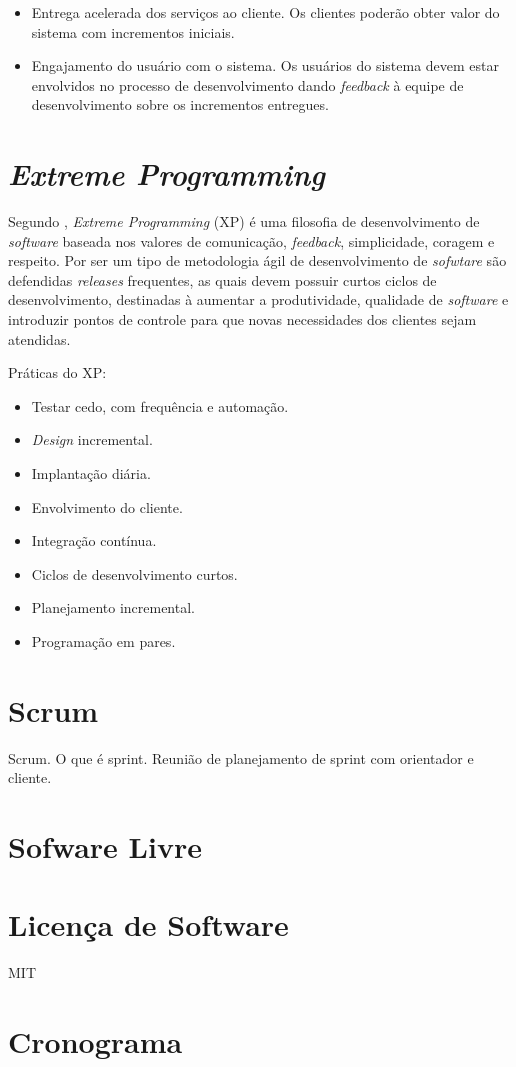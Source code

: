 \begin{itemize}
    \item Entrega acelerada dos serviços ao cliente. Os clientes poderão obter valor do sistema com incrementos iniciais.
    \item Engajamento do usuário com o sistema. Os usuários do sistema devem estar envolvidos no processo
    de desenvolvimento dando \textit{feedback} à equipe de desenvolvimento sobre os incrementos entregues.
\end{itemize}

\section{\textit{Extreme Programming}}
Segundo \cite{beck_2004}, \textit{Extreme Programming} (XP) é uma filosofia de desenvolvimento de
\textit{software} baseada nos valores de comunicação, \textit{feedback}, simplicidade, coragem e respeito.
Por ser um tipo de metodologia ágil de desenvolvimento de \textit{sofwtare} são defendidas \textit{releases}
frequentes, as quais devem possuir curtos ciclos de desenvolvimento, destinadas à aumentar a produtividade, qualidade de \textit{software} e introduzir pontos de controle para que novas necessidades dos clientes sejam atendidas.

Práticas do XP:

\begin{itemize}
    \item Testar cedo, com frequência e automação.
    \item \textit{Design} incremental.
    \item Implantação diária.
    \item Envolvimento do cliente.
    \item Integração contínua.
    \item Ciclos de desenvolvimento curtos.
    \item Planejamento incremental.
    \item Programação em pares.
\end{itemize}

\section{Scrum}
Scrum.
O que é sprint.
Reunião de planejamento de sprint com orientador e cliente.

\section{Sofware Livre}

\section{Licença de Software}
MIT

\section{Cronograma}
